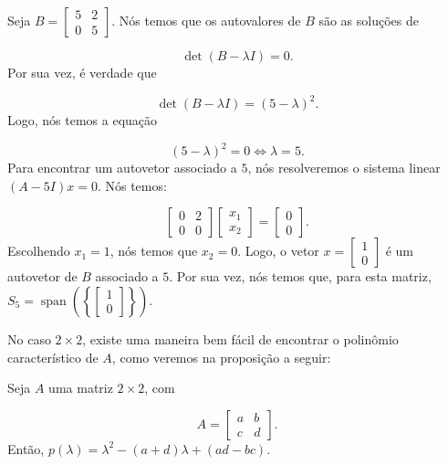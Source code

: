 \begin{Example}
	Seja $B = \begin{bmatrix}
		5 & 2 \\
		0 & 5
	\end{bmatrix}$. Nós temos que os autovalores de $B$ são as soluções de
	
	$$
	\det(B - \lambda I) = 0.
	$$
	Por sua vez, é verdade que
	
	$$
	\det(B - \lambda I) = (5 - \lambda)^2.
	$$
	Logo, nós temos a equação
	
	$$
	(5 - \lambda)^2 = 0 \iff \lambda = 5.
	$$
	Para encontrar um autovetor associado a $5$, nós resolveremos o sistema linear $(A - 5I)x = 0$. Nós temos:
	
	$$
	\begin{bmatrix}
		0 & 2 \\
		0 & 0
	\end{bmatrix}\begin{bmatrix}
		x_1 \\
		x_2
	\end{bmatrix} = \begin{bmatrix}
		0 \\
		0
	\end{bmatrix}.
	$$
	Escolhendo $x_1 = 1$, nós temos que $x_2 = 0$. Logo, o vetor $x = \begin{bmatrix}
		1 \\
		0
	\end{bmatrix}$ é um autovetor de $B$ associado a $5$. Por sua vez, nós temos que, para esta matriz, $S_5 = \operatorname{span}\left(\left\{\begin{bmatrix}
		1 \\
		0
	\end{bmatrix}\right\}\right)$.
\end{Example}

No caso $2\times 2$, existe uma maneira bem fácil de encontrar o polinômio característico de $A$, como veremos na proposição a seguir:

\begin{Proposition}
	Seja $A$ uma matriz $2\times 2$, com
	
	$$
	A = \begin{bmatrix}
		a & b \\
		c & d
	\end{bmatrix}.
	$$
	Então, $p(\lambda) = \lambda^2 - (a + d)\lambda + (ad - bc)$.
\end{Proposition}

